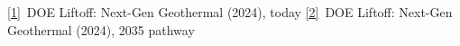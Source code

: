 \href{https://liftoff.energy.gov/}{[1]}~DOE Liftoff: Next-Gen Geothermal (2024), today\quad
\href{https://liftoff.energy.gov/}{[2]}~DOE Liftoff: Next-Gen Geothermal (2024), 2035 pathway
